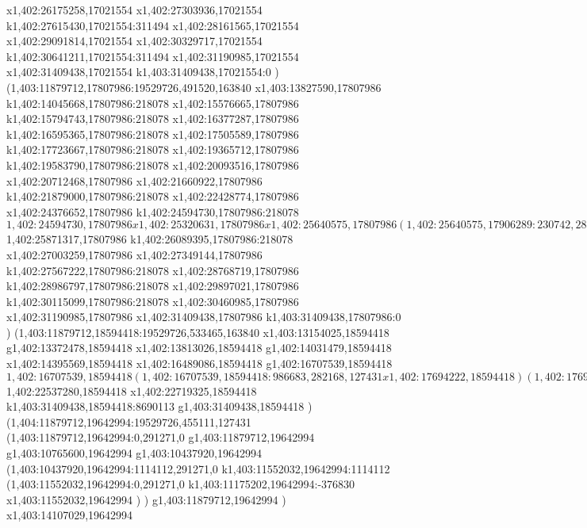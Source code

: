 {x1,402:26175258,17021554
x1,402:27303936,17021554
k1,402:27615430,17021554:311494
x1,402:28161565,17021554
x1,402:29091814,17021554
x1,402:30329717,17021554
k1,402:30641211,17021554:311494
x1,402:31190985,17021554
x1,402:31409438,17021554
k1,403:31409438,17021554:0
)
(1,403:11879712,17807986:19529726,491520,163840
x1,403:13827590,17807986
k1,402:14045668,17807986:218078
x1,402:15576665,17807986
k1,402:15794743,17807986:218078
x1,402:16377287,17807986
k1,402:16595365,17807986:218078
x1,402:17505589,17807986
k1,402:17723667,17807986:218078
x1,402:19365712,17807986
k1,402:19583790,17807986:218078
x1,402:20093516,17807986
x1,402:20712468,17807986
x1,402:21660922,17807986
k1,402:21879000,17807986:218078
x1,402:22428774,17807986
x1,402:24376652,17807986
k1,402:24594730,17807986:218078
$1,402:24594730,17807986
x1,402:25320631,17807986
x1,402:25640575,17807986
(1,402:25640575,17906289:230742,282169,0
x1,402:25838549,17906289
)
$1,402:25871317,17807986
k1,402:26089395,17807986:218078
x1,402:27003259,17807986
x1,402:27349144,17807986
k1,402:27567222,17807986:218078
x1,402:28768719,17807986
k1,402:28986797,17807986:218078
x1,402:29897021,17807986
k1,402:30115099,17807986:218078
x1,402:30460985,17807986
x1,402:31190985,17807986
x1,402:31409438,17807986
k1,403:31409438,17807986:0
)
(1,403:11879712,18594418:19529726,533465,163840
x1,403:13154025,18594418
g1,402:13372478,18594418
x1,402:13813026,18594418
g1,402:14031479,18594418
x1,402:14395569,18594418
x1,402:16489086,18594418
g1,402:16707539,18594418
$1,402:16707539,18594418
(1,402:16707539,18594418:986683,282168,127431
x1,402:17694222,18594418
)
(1,402:17694222,18754616:230742,282169,0
x1,402:17892196,18754616
)
g1,402:18034188,18594418
x1,402:18977404,18594418
[1,402:18977404,18756434:294003,695481,0
(1,402:18977404,18356593:294003,295640,0
x1,402:19238639,18356593
)
(1,402:18977404,18756434:230742,282169,0
x1,402:19175378,18756434
)
]
x1,402:19924490,18594418
(1,402:19924490,18692721:901578,295640,54614
x1,402:20793300,18692721
)
x1,402:21008113,18594418
g1,402:21190153,18594418
x1,402:21699879,18594418
g1,402:21881919,18594418
x1,402:22537280,18594418
$1,402:22537280,18594418
x1,402:22719325,18594418
k1,403:31409438,18594418:8690113
g1,403:31409438,18594418
)
(1,404:11879712,19642994:19529726,455111,127431
(1,403:11879712,19642994:0,291271,0
g1,403:11879712,19642994
g1,403:10765600,19642994
g1,403:10437920,19642994
(1,403:10437920,19642994:1114112,291271,0
k1,403:11552032,19642994:1114112
(1,403:11552032,19642994:0,291271,0
k1,403:11175202,19642994:-376830
x1,403:11552032,19642994
)
)
g1,403:11879712,19642994
)
x1,403:14107029,19642994
}
